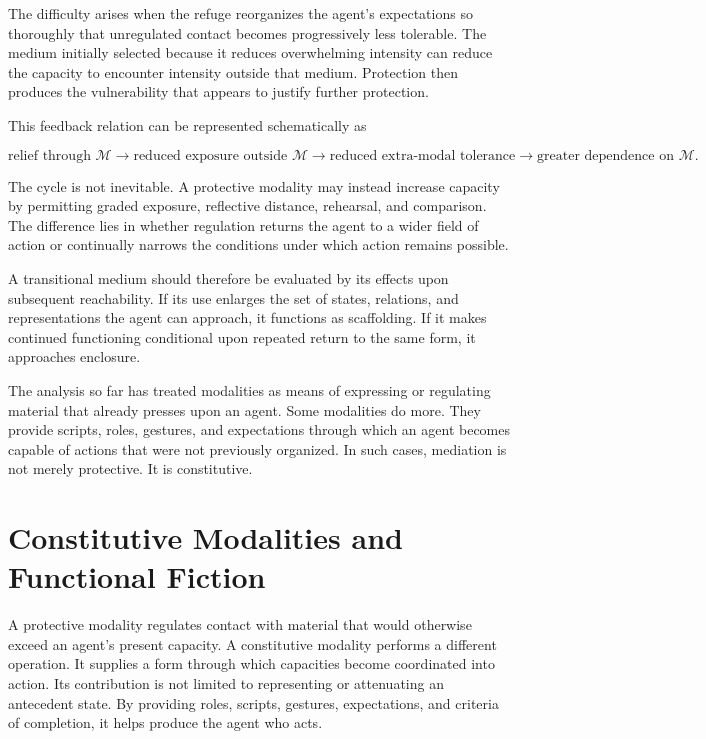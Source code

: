 \documentclass[11pt]{article}
\newcommand{\modality}{\mathcal{M}}
\begin{document}
The difficulty arises when the refuge reorganizes the agent's expectations so
thoroughly that unregulated contact becomes progressively less tolerable. The
medium initially selected because it reduces overwhelming intensity can
reduce the capacity to encounter intensity outside that medium. Protection
then produces the vulnerability that appears to justify further protection.

This feedback relation can be represented schematically as

\begin{equation}
  \text{relief through }\modality
  \longrightarrow
  \text{reduced exposure outside }\modality
  \longrightarrow
  \text{reduced extra-modal tolerance}
  \longrightarrow
  \text{greater dependence on }\modality.
  \label{eq:protective-feedback}
\end{equation}

The cycle is not inevitable. A protective modality may instead increase
capacity by permitting graded exposure, reflective distance, rehearsal, and
comparison. The difference lies in whether regulation returns the agent to a
wider field of action or continually narrows the conditions under which action
remains possible.

A transitional medium should therefore be evaluated by its effects upon
subsequent reachability. If its use enlarges the set of states, relations, and
representations the agent can approach, it functions as scaffolding. If it
makes continued functioning conditional upon repeated return to the same form,
it approaches enclosure.

The analysis so far has treated modalities as means of expressing or
regulating material that already presses upon an agent. Some modalities do
more. They provide scripts, roles, gestures, and expectations through which an
agent becomes capable of actions that were not previously organized. In such
cases, mediation is not merely protective. It is constitutive.

\section{Constitutive Modalities and Functional Fiction}

A protective modality regulates contact with material that would otherwise
exceed an agent's present capacity. A constitutive modality performs a
different operation. It supplies a form through which capacities become
coordinated into action. Its contribution is not limited to representing or
attenuating an antecedent state. By providing roles, scripts, gestures,
expectations, and criteria of completion, it helps produce the agent who acts.
\end{document}

